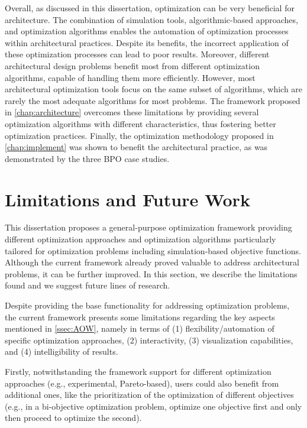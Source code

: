 Overall, as discussed in this dissertation, optimization can be very beneficial for architecture. The combination of simulation tools, algorithmic-based approaches, and optimization algorithms enables the automation of optimization processes within architectural practices. Despite its benefits, the incorrect application of these optimization processes can lead to poor results. Moreover, different architectural design problems benefit most from different optimization algorithms, capable of handling them more efficiently. However, most architectural optimization tools focus on the same subset of algorithms, which are rarely the most adequate algorithms for most problems. The framework proposed in \cref{chap:architecture} overcomes these limitations by providing several optimization algorithms with different characteristics, thus fostering better optimization practices. Finally, the optimization methodology proposed in \cref{chap:implement} was shown to benefit the architectural practice, as was demonstrated by the three \ac{BPO} case studies.
	
\section{Limitations and Future Work}
This dissertation proposes a general-purpose optimization framework providing different optimization approaches and optimization algorithms particularly tailored for optimization problems including simulation-based objective functions. Although the current framework already proved valuable to address architectural problems, it can be further improved. In this section, we describe the limitations found and we suggest future lines of research.

Despite providing the base functionality for addressing optimization problems, the current framework presents some limitations regarding the key aspects mentioned in \cref{ssec:AOW}, namely in terms of (1) flexibility/automation of specific optimization approaches, (2) interactivity, (3) visualization capabilities, and (4) intelligibility of results.

Firstly, notwithstanding the framework support for different optimization approaches (e.g., experimental, Pareto-based), users could also benefit from additional ones, like the prioritization of the optimization of different objectives (e.g., in a bi-objective optimization problem, optimize one objective first and only then proceed to optimize the second). 

